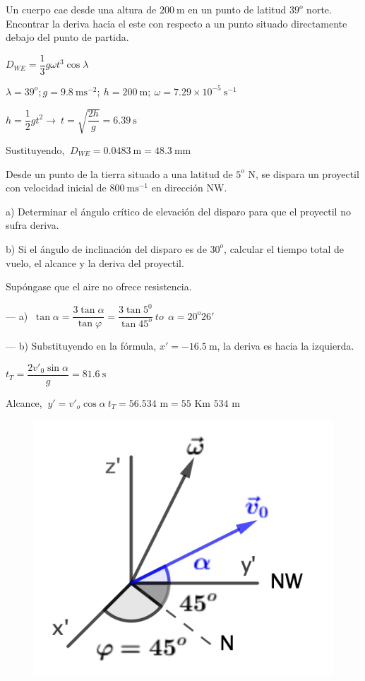 \begin{prob}
Un cuerpo cae desde una altura de $200\ \mathrm{m}$ en un punto de latitud $39^o$	norte. Encontrar la deriva hacia el este con respecto a un punto situado directamente debajo del punto de partida.
\end{prob}

$D_{WE}=\dfrac 1 3 g \omega t^3 \cos \lambda$

$\lambda=39^o; g=9.8\ \text{ms}^{-2}; \ h=200\ \text{m}; \ \omega=7.29\times 10^{-5}\ \text{s}^{-1}$

$h=\dfrac 1 2 g t^2 \to \ t=\sqrt{\dfrac{2h}g}=6.39\ \text{s}$

Sustituyendo, $\ D_{WE}=0.0483\ \text{m}=48.3\ \text{mm}$

\begin{prob}
Desde un punto de la tierra situado a una latitud de $5^o$ N, se dispara un proyectil con velocidad inicial de $800\ \mathrm{m s}^{-1}$ en dirección NW.
\vspace{-3mm} %
\begin{changemargin}{5mm}{5mm} 
	a) Determinar el ángulo crítico de elevación del disparo para que el proyectil no sufra deriva.

	b) Si el ángulo de inclinación del disparo es de $30^o$, calcular el tiempo total de vuelo, el alcance y la deriva del proyectil.
\end{changemargin} 

Supóngase que el aire no ofrece resistencia.	
\end{prob}
\begin{multicols}{2}
--- a) $\ \tan \alpha=\dfrac{3 \tan \alpha}{\tan \varphi}=\dfrac{3 \tan 5^0}{\tan 45^o} \ to \ \ \alpha=20^o 26'$

--- b) Substituyendo en la fórmula, $x'=-16.5\ \text{m}$, la deriva es hacia la izquierda.

$t_T=\dfrac{2v'_0 \sin \alpha}{g}=81.6\ \text{s}$

Alcance, $\ y'=v'_o \cos \alpha \ t_T = 56.534 \text{ m}=55 \text{ Km } 534 \text{ m}$
\begin{figure}[H]
	\centering
	\includegraphics[width=.5\textwidth]{imagenes/imagenes10/T10IM17.png}
\end{figure}
\end{multicols}



